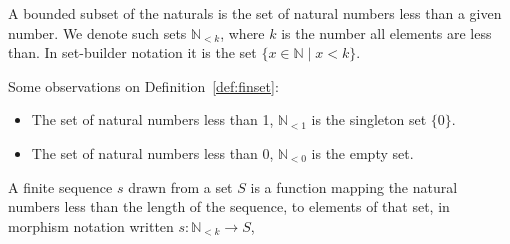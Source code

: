 \documentclass{DIKU-report-variant}
\newcommand\Nat{\mathbb{N}}
\begin{document}
\begin{definition}
  \label{def:finset}
  A bounded subset of the naturals is
  the set of natural numbers less than a given number.
  We denote such sets \(\Nat_{<k}\), where \(k\) is the number
  all elements are less than. In set-builder notation it is the set \(\{ x \in \Nat \mid x < k \}\).
\end{definition}
\begin{observation}
  \label{ob:finset}
  Some observations on Definition~\ref{def:finset}:
  \begin{itemize}
    \item The set of natural numbers less than 1, \(\Nat_{<1}\) is the singleton set \(\{0\}\).
    \item The set of natural numbers less than 0, \(\Nat_{<0}\) is the empty set.
  \end{itemize}
\end{observation}

\begin{definition}
  \label{def:finseq}
  A finite sequence \(s\) drawn from a set \(S\) is a function mapping the natural
  numbers less than the length of the sequence, to elements of that set,
  in morphism notation written \(s : \Nat_{<k} \to S\),
\end{definition}
\end{document}
